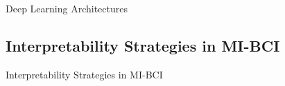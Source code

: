 \documentclass[aspectratio=169]{beamer}
\begin{document}
\begin{frame}{Deep Learning Architectures}
    \begin{figure}[!ht]
        \centering
    \end{figure}
\end{frame}

\subsection{Interpretability Strategies in MI-BCI}

\begin{frame}{Interpretability Strategies in MI-BCI}
    \begin{figure}[!ht]
        \centering
    \end{figure}
\end{frame}
\end{document}
